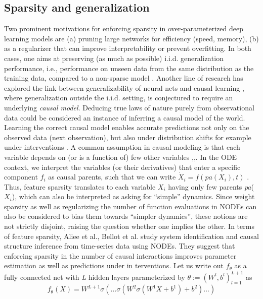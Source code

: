\documentclass{article}
\begin{document}
    \subsection{Sparsity and generalization}
    Two prominent motivations for enforcing sparsity in over-parameterized deep learning models are
    (a) pruning large networks for efficiency (speed, memory), (b) as a regularizer that can improve
    interpretability or prevent overfitting. In both cases, one aims at preserving (as much as possible)
    i.i.d. generalization performance, i.e., performance on unseen data from the same distribution as the
    training data, compared to a non-sparse model \cite{Lambert2018-nc}.
    Another line of research has explored the link between generalizability of neural nets and causal
    learning \cite{xu2022sparse}, where generalization outside the i.i.d. setting, is conjectured to require an underlying
    \textit{causal model}. Deducing true laws of nature purely from observational data could be considered an
    instance of inferring a causal model of the world. Learning the correct causal model enables accurate
    predictions not only on the observed data (next observation), but also under distribution shifts for
    example under interventions \cite{Micci2013}. A common assumption in causal modeling is that each variable
    depends on (or is a function of) few other variables \cite{Du18},\cite{Wolf2018},\cite{xu2021characteristic}. In the ODE context, we interpret
    the variables (or their derivatives) that enter a specific component \textit{$f_{i}$}
  as causal parents, such that we
    can write $\dot{X}_i = f(pa(X_i), t)$
 \cite{pal2021opening}. Thus, feature sparsity translates to     each variable \textit{$X_{i}$} having only
    few parents \textit{pa}(\textit{$X_{i}$}), which can also be interpreted as asking for “simple” dynamics. Since weight
    sparsity as well as regularizing the number of function evaluations in NODEs can also be considered
    to bias them towards “simpler dynamics”, these notions are      not strictly disjoint, raising the question
    whether one implies the other.
    In terms of feature sparsity, Aliee et al.\cite{Liu2022}, Bellot et al. \cite{Micci2013} study system identification and causal
    structure inference from time-series data using NODEs. They suggest that enforcing sparsity in
    the number of causal interactions improves parameter estimation as well as predictions under in terventions. Let us write out $f_{\theta}$ as a fully connected net with \textit{L} hidden layers parameterized by
    $\theta := (W^l, b^l)_{l=1}^{L+1}$ as\\
    \vspace{5pt}
    \[
f_{\theta}(X) = W^{L+1} \sigma\left(\ldots \sigma\left(W^{2} \sigma\left(W^{1} X + b^{1}\right) + b^{2}\right) \ldots\right) \tag{1}
\]
\end{document}
